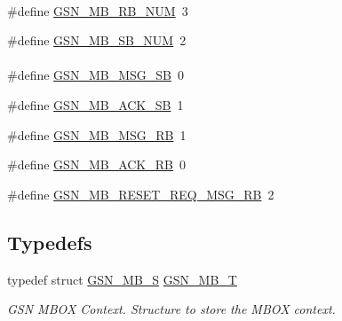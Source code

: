 \paragraph*{}
\begin{DoxyCompactItemize}
\item 
\#define \hyperlink{a00525_a03fa48378435650e00f73d3b5d822995}{GSN\_\-MB\_\-RB\_\-NUM}~3
\item 
\#define \hyperlink{a00525_aee0412ec5b5a95e91d984eadc705156e}{GSN\_\-MB\_\-SB\_\-NUM}~2
\end{DoxyCompactItemize}

\paragraph*{}
\begin{DoxyCompactItemize}
\item 
\#define \hyperlink{a00525_a39c88dda945823a26f93595d4d5c5149}{GSN\_\-MB\_\-MSG\_\-SB}~0
\item 
\#define \hyperlink{a00525_a36736dbc3bbc82dec117864da76b7902}{GSN\_\-MB\_\-ACK\_\-SB}~1
\item 
\#define \hyperlink{a00525_a71a810f6bb430724f2f85a08d82cbb7a}{GSN\_\-MB\_\-MSG\_\-RB}~1
\item 
\#define \hyperlink{a00525_abac20b8f3cace42e16aa0203cade4d34}{GSN\_\-MB\_\-ACK\_\-RB}~0
\item 
\#define \hyperlink{a00525_a307bbfd45d760659e6245707ea58558f}{GSN\_\-MB\_\-RESET\_\-REQ\_\-MSG\_\-RB}~2
\end{DoxyCompactItemize}

\subsection*{Typedefs}
\begin{DoxyCompactItemize}
\item 
typedef struct \hyperlink{a00139}{GSN\_\-MB\_\-S} \hyperlink{a00624_gafb7207d32d68a7fa15928ef5fd8bf5f1}{GSN\_\-MB\_\-T}
\begin{DoxyCompactList}\small\item\em GSN MBOX Context. Structure to store the MBOX context. \end{DoxyCompactList}\end{DoxyCompactItemize}
